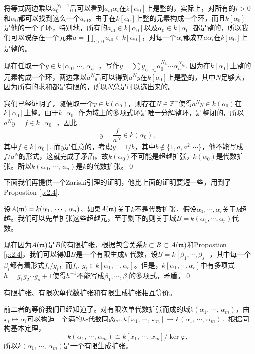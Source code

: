 	将等式两边乘以$a_0^{N_i-1}$后可以看到$a_{i0}\alpha_i$在$k[\alpha_0]$上是整的，实际上，对所有的$i>0$和$\alpha_0$都可以找到这么一个$a_{i0}$。由于在$k[\alpha_0]$上整的元素构成一个环，而且$k[\alpha_0]$是他的一个子环，特别地，所有的$a_{i0}\in k[\alpha_0]$以及$\alpha_0\in k[\alpha_0]$都是整的，所以我们可以说存在一个元素$a=\prod_{i>0}a_{i0}\in k[\alpha_0]$，对每一个$\alpha_i$都成立$a\alpha_i$在$k[\alpha_0]$上是整的。

	现在任取一个$y\in k[\alpha_0,\,\cdots,\,\alpha_n]$，写作$y=\sum y_{i_0 \cdots i_n}\alpha_0^{N_{i_0}}\cdots\alpha_{n}^{N_{i_n}}$.
	因为在$k[\alpha_0]$上整的元素构成一个环，两边乘以$a^N$后可以得到$a^Ny$在$k[\alpha_0]$上是整的，其中$N$足够大，因为所有的求和都是有限的，所以$N$总是可以选出来的。

	我们已经证明了，随便取一个$y\in k(\alpha_0)$，则存在$N\in \mathbb{Z}^+$使得$a^Ny\in k(\alpha_0)$在$k[\alpha_0]$上整。由于$k[\alpha_0]$作为域上的多项式环是唯一分解整环，是整闭的，所以$a^Ny=f\in k[\alpha_0]$，因此
	\[
		y=\frac{f}{a^N}\in k(\alpha_0),
	\]
	其中$f\in k[\alpha_0]$. 而$y$是任意的，考虑$y=1/b$，其中$b\not\in \{1,a,a^2,\cdots\}$，他不能写成$f/a^N$的形式，这就完成了矛盾。故$k(\alpha_0)$不可能是超越扩张，$k(\alpha_0)$是代数扩张。所以$k(\alpha_0,\,\cdots,\,\alpha_{n})$是$k$的代数扩张。\qed

下面我们再提供一个Zariski引理的证明，他比上面的证明要短一些，用到了Propostion \eqref{p:2.4}.

\proof 设$A(\mathfrak{m})=k(\alpha_1,\,\cdots,\,\alpha_n)$，如果$A(\mathfrak{m})$关于$k$不是代数扩张，假设$\alpha_1,\cdots ,\alpha_r$关于$k$超越。我们可以先单扩张这些超越元，至于剩下的则关于域$B=k(\alpha_1,\cdots ,\alpha_r)$代数。

现在因为$A(\mathfrak{m})$是$B$的有限扩张，根据包含关系$k\subset B\subset A(\mathfrak{m})$和Propostion \eqref{p:2.4}，我们可以得知$B$是一个有限生成$k$-代数，设$B=k[\beta_1,\cdots,\beta_s]$，其中每一个$\beta_i$都有着形式$f_i/g_i$，而$f_i$, $g_i\in k[\alpha_1,\cdots,\alpha_r]$。但是，$k[\alpha_1,\cdots,\alpha_r]$中有多项式$h=g_1g_2\cdots g_{s}+1$使得$h^{-1}$不能写成$\beta_1,\cdots,\beta_s$的多项式，矛盾。\qed

\pro  有限扩张、有限次单代数扩张和有限生成扩张相互等价。

\proof 前二者的等价我们已经知道了。对有限次单代数扩张而成的域$k(\alpha_1,\,\cdots,\,\alpha_m)$，由$x_i\mapsto \alpha_i$可以构造一个满的$k$-代数同态$\varphi:k[x_1,\,\cdots,\,x_m]\to k(\alpha_1,\,\cdots,\,\alpha_m)$，根据同构基本定理，
\[k(\alpha_1,\,\cdots,\,\alpha_m)\cong k[x_1,\,\cdots,\,x_m]/\ker \varphi,\]所以$k(\alpha_1,\,\cdots,\,\alpha_m)$是一个有限生成扩张。

